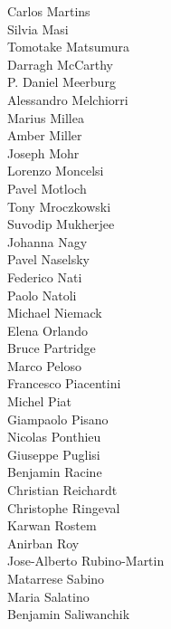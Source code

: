 \documentclass[PICOAPC.tex]{subfiles}
\begin{document}
{\begin{multicols}{4}
Carlos Martins                  \\
Silvia Masi                     \\
Tomotake Matsumura              \\
Darragh McCarthy                \\
P. Daniel Meerburg              \\
Alessandro Melchiorri           \\
Marius Millea                   \\
Amber Miller                    \\
Joseph Mohr                     \\
Lorenzo Moncelsi                \\
Pavel Motloch                   \\
Tony Mroczkowski                \\
Suvodip Mukherjee               \\
Johanna Nagy                    \\
Pavel Naselsky                  \\
Federico Nati                   \\
Paolo Natoli                    \\
Michael Niemack                 \\
Elena Orlando                   \\
Bruce Partridge                 \\
Marco Peloso                    \\
Francesco Piacentini            \\
Michel Piat                     \\
Giampaolo Pisano                \\
Nicolas Ponthieu                \\
Giuseppe Puglisi                \\
Benjamin Racine                 \\
Christian Reichardt             \\
Christophe Ringeval             \\
Karwan Rostem                   \\
Anirban Roy                     \\
Jose-Alberto Rubino-Martin      \\
Matarrese Sabino                \\
Maria Salatino                  \\
Benjamin Saliwanchik            \\

\end{multicols}}
\end{document}
